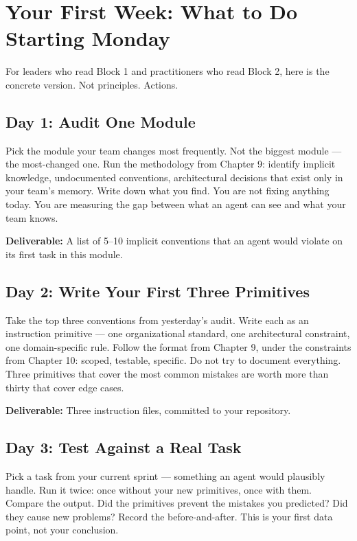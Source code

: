 \documentclass[
  a4paper,
  DIV=11,
  numbers=noendperiod]{scrreprt}
\begin{document}
\section{Your First Week: What to Do Starting
Monday}\label{your-first-week-what-to-do-starting-monday}

For leaders who read Block 1 and practitioners who read Block 2, here is
the concrete version. Not principles. Actions.

\subsection{Day 1: Audit One Module}\label{day-1-audit-one-module}

Pick the module your team changes most frequently. Not the biggest
module --- the most-changed one. Run the methodology from Chapter 9:
identify implicit knowledge, undocumented conventions, architectural
decisions that exist only in your team's memory. Write down what you
find. You are not fixing anything today. You are measuring the gap
between what an agent can see and what your team knows.

\textbf{Deliverable:} A list of 5--10 implicit conventions that an agent
would violate on its first task in this module.

\subsection{Day 2: Write Your First Three
Primitives}\label{day-2-write-your-first-three-primitives}

Take the top three conventions from yesterday's audit. Write each as an
instruction primitive --- one organizational standard, one architectural
constraint, one domain-specific rule. Follow the format from Chapter 9,
under the constraints from Chapter 10: scoped, testable, specific. Do
not try to document everything. Three primitives that cover the most
common mistakes are worth more than thirty that cover edge cases.

\textbf{Deliverable:} Three instruction files, committed to your
repository.

\subsection{Day 3: Test Against a Real
Task}\label{day-3-test-against-a-real-task}

Pick a task from your current sprint --- something an agent would
plausibly handle. Run it twice: once without your new primitives, once
with them. Compare the output. Did the primitives prevent the mistakes
you predicted? Did they cause new problems? Record the before-and-after.
This is your first data point, not your conclusion.
\end{document}
